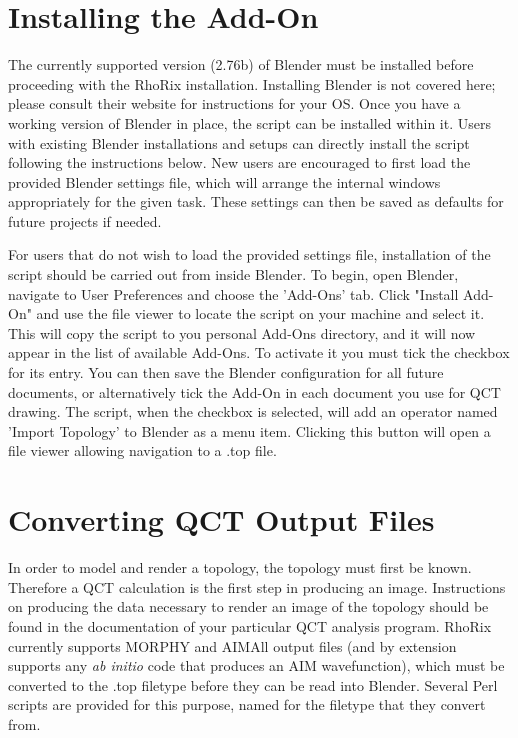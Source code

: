\documentclass{tufte-handout}
\newcommand{\blenderVersion}{2.76b}
\newcommand{\programName}{RhoRix}
\newcommand{\addonPath}{User Preferences $\rightarrow$ Add-Ons}
\begin{document}
\section{Installing the Add-On}
The currently supported version (\blenderVersion{}) of Blender must be installed before proceeding with the \programName{} installation. Installing Blender is not covered here; please consult their website for instructions for your OS. 
Once you have a working version of Blender in place, the script can be installed within it.
Users with existing Blender installations and setups can directly install the script following the instructions below.
New users are encouraged to first load the provided Blender settings file, which will arrange the internal windows appropriately for the given task.
These settings can then be saved as defaults for future projects if needed.
\par{}
For users that do not wish to load the provided settings file, installation of the script should be carried out from inside Blender.
To begin, open Blender, navigate to User Preferences and choose the 'Add-Ons' tab\sidenote{\addonPath{}}.
Click "Install Add-On" and use the file viewer to locate the script on your machine and select it.
This will copy the script to you personal Add-Ons directory, and it will now appear in the list of available Add-Ons.
To activate it you must tick the checkbox for its entry.
You can then save the Blender configuration for all future documents, or alternatively tick the Add-On in each document you use for QCT drawing.
The script, when the checkbox is selected, will add an operator named 'Import Topology' to Blender as a menu item.
Clicking this button will open a file viewer allowing navigation to a .top file.

\section{Converting QCT Output Files}
In order to model and render a topology, the topology must first be known. 
Therefore a QCT calculation is the first step in producing an image. 
Instructions on producing the data necessary to render an image of the topology should be found in the documentation of your particular QCT analysis program.
\programName{} currently supports MORPHY and AIMAll output files (and by extension supports any \textit{ab initio} code that produces an AIM wavefunction), which must be converted to the .top filetype before they can be read into Blender. 
Several Perl scripts are provided for this purpose, named for the filetype that they convert from.
\end{document}
